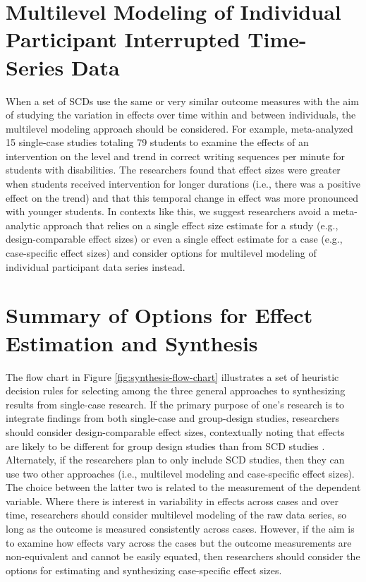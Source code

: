 \documentclass[
]{book}
\begin{document}
\hypertarget{multilevel-modeling-of-individual-participant-interrupted-time-series-data}{%
\section{Multilevel Modeling of Individual Participant Interrupted Time-Series Data}\label{multilevel-modeling-of-individual-participant-interrupted-time-series-data}}

When a set of SCDs use the same or very similar outcome measures with the aim of studying the variation in effects over time within and between individuals, the multilevel modeling approach should be considered.
For example, \citet{datchuk2020Level} meta-analyzed 15 single-case studies totaling 79 students to examine the effects of an intervention on the level and trend in correct writing sequences per minute for students with disabilities.
The researchers found that effect sizes were greater when students received intervention for longer durations (i.e., there was a positive effect on the trend) and that this temporal change in effect was more pronounced with younger students.
In contexts like this, we suggest researchers avoid a meta-analytic approach that relies on a single effect size estimate for a study (e.g., design-comparable effect sizes) or even a single effect estimate for a case (e.g., case-specific effect sizes) and consider options for multilevel modeling of individual participant data series instead.

\hypertarget{summary-of-options-for-effect-estimation-and-synthesis}{%
\section{Summary of Options for Effect Estimation and Synthesis}\label{summary-of-options-for-effect-estimation-and-synthesis}}

The flow chart in Figure \ref{fig:synthesis-flow-chart} illustrates a set of heuristic decision rules for selecting among the three general approaches to synthesizing results from single-case research.
If the primary purpose of one's research is to integrate findings from both single-case and group-design studies, researchers should consider design-comparable effect sizes, contextually noting that effects are likely to be different for group design studies than from SCD studies \citet{Chen_Pustejovsky_2022}.
Alternately, if the researchers plan to only include SCD studies, then they can use two other approaches (i.e., multilevel modeling and case-specific effect sizes).
The choice between the latter two is related to the measurement of the dependent variable.
Where there is interest in variability in effects across cases and over time, researchers should consider multilevel modeling of the raw data series, so long as the outcome is measured consistently across cases.
However, if the aim is to examine how effects vary across the cases but the outcome measurements are non-equivalent and cannot be easily equated, then researchers should consider the options for estimating and synthesizing case-specific effect sizes.
\end{document}
